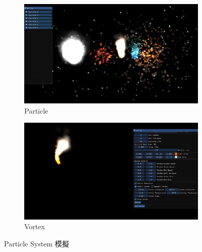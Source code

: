 \begin{figure}[h]
    \begin{subfigure}[b]{0.5\linewidth}
        \includegraphics[width=\linewidth]{./resources/particleSystem/particle.png}
        \caption{Particle}
    \end{subfigure}
    \begin{subfigure}[b]{0.5\linewidth}
        \includegraphics[width=\linewidth]{./resources/particleSystem/vortex.png}
        \caption{Vortex}
    \end{subfigure}
\caption{Particle System 模擬}
\label{fig:simulate}
\end{figure}



\newpage
